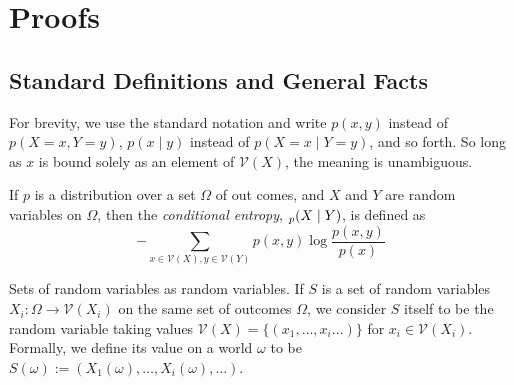 \documentclass{article}
\theoremstyle{plain}
\theoremstyle{definition}
\theoremstyle{remark}
\let\H\relax
\DeclareMathOperator{\H}{\mathrm{H}} %
\newcommand{\V}{\mathcal V}
\numberwithin{equation}{section}
\begin{document}
	\begin{ack}
	\end{ack}

	{
		\small
		

%                
                        
	}
	\onecolumn
	\appendix
	
	\section{Proofs} \label{sec:proofs}
	\subsection{Standard Definitions and General Facts}
	For brevity, we use the standard notation and write $p(x, y)$ instead of $p(X \!=\! x, Y \!=\! y)$, $p(x \mid y)$ instead of $p(X \!=\! x\mid Y \!=\! y)$, and so forth. So long as $x$ is bound solely as an element of $\V(X)$, the meaning is unambiguous. 
	
	
	\begin{defn}
		If $p$ is a distribution over a set $\Omega$ of out comes, and $X$ and $Y$ are random variables on $\Omega$, then the \emph{conditional entropy}, $\H_p(X \mid Y)$, is defined as 
		\[ - \sum_{x \in \V(X), y \in \V(Y)} p(x,y) \log \frac{p(x,y)}{p(x)} \]
	\end{defn}
	
	
	\begin{defn} \label{def:set-rv}
		Sets of random variables as random variables. If $S$ is a set of random variables $X_i : \Omega \to \V(X_i)$ on the same set of outcomes $\Omega$, we consider $S$ itself to be the random variable taking values $\V(X) = \{(x_1, \ldots, x_i \ldots) \}$ for $x_i \in \V(X_i)$. Formally, we define its value on a world $\omega$ to be $S(\omega) := (X_1(\omega), \ldots, X_i(\omega), \ldots)$. 
	\end{defn}
\end{document}
